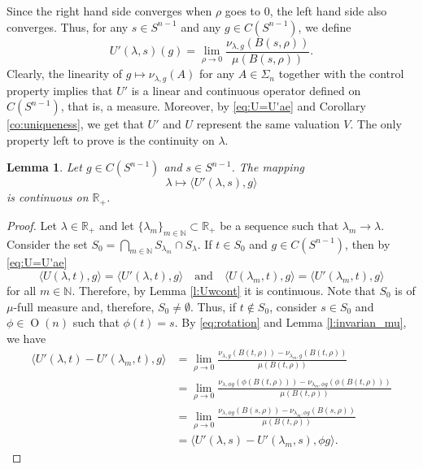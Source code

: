 \documentclass[11pt, a4paper]{amsart}
\newtheorem{lemma}[proposition]{Lemma}
\newcommand{\rp}{\mathbb R_{\scriptscriptstyle +}}
\newcommand{\sn}{{S^{n-1}}}
\newcommand{\on}{\operatorname{O}(n)}
\begin{document}
Since the right hand side converges when $\rho$ goes to 0, the left hand side also converges. Thus, for any $s\in \sn$ and any $g\in C(\sn)$, we define 
\begin{equation}\label{eq:defin_U'}
    U'(\lambda,s)(g)=
    \lim_{\rho\to 0}\frac{\nu_{\lambda,g}(B(s,\rho))}{\mu(B(s,\rho))}.
\end{equation}
Clearly, the linearity of $g\mapsto \nu_{\lambda,g}(A)$ for any $A\in\Sigma_n$ together with the control property implies that $U'$ is a linear and continuous operator defined on $C(\sn)$, that is, a measure. Moreover, by \eqref{eq:U=U'ae} and Corollary \ref{co:uniqueness}, we get that $U'$ and $U$ represent the same valuation $V$. The only property left to prove is the continuity on $\lambda$.

\begin{lemma}
Let $g\in C(\sn)$ and $s\in\sn$. The mapping
\[
    \lambda\mapsto \langle U'(\lambda,s),g\rangle
\]
is continuous on $\rp$.
\end{lemma}
\begin{proof}
Let $\lambda\in\rp$ and let $\{\lambda_m\}_{m\in\mathbb{N}}\subset\rp$ be a sequence such that $\lambda_m\to \lambda$. Consider the set $S_0
=\bigcap_{m\in\mathbb{N}}S_{\lambda_m}\cap S_\lambda$. If $t\in S_0
$ and $g\in C(\sn)$, then by \eqref{eq:U=U'ae}
\[
    \langle U(\lambda,t),g\rangle=\langle U'(\lambda,t),g\rangle \quad \text{and}\quad \langle U(\lambda_m,t),g\rangle=\langle U'(\lambda_m,t),g\rangle
\]
for all $m\in\mathbb{N}$. Therefore, by Lemma \ref{l:Uwcont} it is continuous.
Note that $S_0
$ is of $\mu$-full measure and, therefore, $S_0\neq\emptyset$. Thus, if $t\not\in S_0
$, consider $s\in S_0$ and $\phi\in\on$ such that $\phi(t)=s$. By \eqref{eq:rotation} and Lemma \ref{l:invarian_mu}, we have
\begin{align*}
    \langle U'(\lambda,t)-U'(\lambda_m,t),g\rangle &=\lim_{\rho\to 0}\frac{\nu_{\lambda,g}(B(t,\rho))-\nu_{\lambda_m,g}(B(t,\rho))}{\mu(B(t,\rho))}\\
    &=\lim_{\rho\to 0}\frac{\nu_{\lambda,\phi g}(\phi(B(t,\rho)))-\nu_{\lambda_m,\phi g}(\phi(B(t,\rho)))}{\mu(B(t,\rho))}\\
    &=\lim_{\rho\to 0}\frac{\nu_{\lambda,\phi g}(B(s,\rho))-\nu_{\lambda_m, \phi g}(B(s,\rho))}{\mu(B(t,\rho))}\\
    &=\langle U'(\lambda,s)-U'(\lambda_m,s),\phi g\rangle.
\end{align*}
\end{proof}
\end{document}
